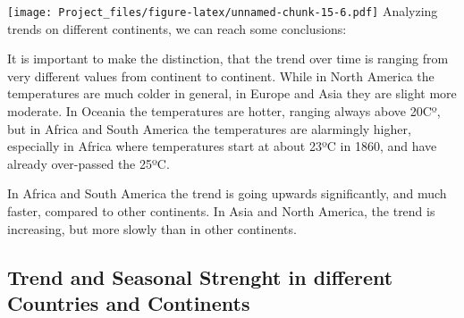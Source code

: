\documentclass[
]{article}
\begin{document}
\texttt{[image: Project\_files/figure-latex/unnamed-chunk-15-6.pdf]}
Analyzing trends on different continents, we can reach some conclusions:

It is important to make the distinction, that the trend over time is
ranging from very different values from continent to continent. While in
North America the temperatures are much colder in general, in Europe and
Asia they are slight more moderate. In Oceania the temperatures are
hotter, ranging always above 20Cº, but in Africa and South America the
temperatures are alarmingly higher, especially in Africa where
temperatures start at about 23ºC in 1860, and have already over-passed
the 25ºC.

In Africa and South America the trend is going upwards significantly,
and much faster, compared to other continents. In Asia and North
America, the trend is increasing, but more slowly than in other
continents.

\hypertarget{trend-and-seasonal-strenght-in-different-countries-and-continents}{%
\subsection{Trend and Seasonal Strenght in different Countries and
Continents}\label{trend-and-seasonal-strenght-in-different-countries-and-continents}}
\end{document}
